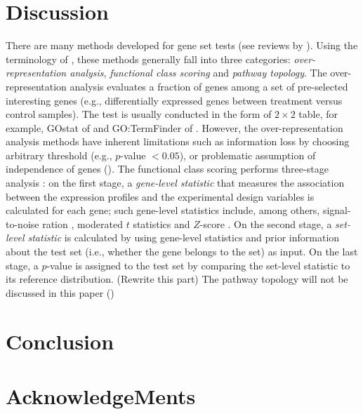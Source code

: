\documentclass[11pt, a4paper]{article}
\begin{document}
	\section{Discussion}
		 
		 There are many methods developed for gene set tests (see reviews by \cite{huang2009bioinformatics, khatri2012ten, tarca2013comparison}). Using the terminology of \cite{khatri2012ten}, these methods generally fall into three categories: \textit{over-representation analysis}, \textit{functional class scoring} and \textit{pathway topology}. The over-representation analysis evaluates a fraction of genes among a set of pre-selected interesting genes (e.g., differentially expressed genes between treatment versus control samples). The test is usually conducted in the form of $2\times 2$ table, for example, GOstat of \cite{klebanov2007multivariate} and GO:TermFinder of \cite{tian2005discovering}. However, the over-representation analysis methods have inherent limitations such as information loss by choosing arbitrary threshold (e.g., $p$-value $< 0.05$), or problematic assumption of independence of genes (\cite{goeman2007analyzing, wu2012camera}). The functional class scoring performs three-stage analysis \citep{khatri2012ten}: on the first stage, a \textit{gene-level statistic} that measures the association between the expression profiles and the experimental design variables is calculated for each gene; such gene-level statistics include, among others, signal-to-noise ration \citep{subramanian2005gene}, moderated $t$ statistics \citep{Smyth2004moderated} and  $Z$-score \citep{efron2007correlation}. On the second stage, a \textit{set-level statistic} is calculated by using gene-level statistics and prior information about the test set (i.e., whether the gene belongs to the set) as input. On the last stage, a $p$-value is assigned to the test set by comparing the set-level statistic to its reference distribution.  (Rewrite this part)		 
		 The pathway topology will not be discussed in this paper (\cite{khatri2012ten, tarca2013comparison})
		 	
	\section{Conclusion}\label{section:conclusion}
	
	\section{AcknowledgeMents}\label{section:acknowledgement}
	
\end{document}
